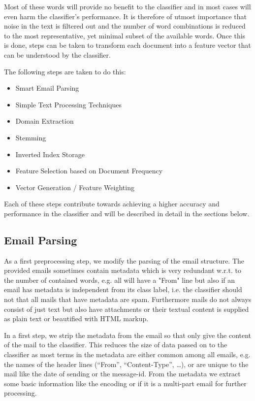 Most of these words will provide no benefit to the classifier and in most cases will even harm the classifier's performance. It is therefore of utmost importance that noise in the text is filtered out and the number of word combinations is reduced to the most representative, yet minimal subset of the available words. Once this is done, steps can be taken to transform each document into a feature vector that can be understood by the classifier. 

The following steps are taken to do this:
\begin{itemize}
	\item Smart Email Parsing
	\item Simple Text Processing Techniques
	\item Domain Extraction
	\item Stemming
	\item Inverted Index Storage
	\item Feature Selection based on Document Frequency
	\item Vector Generation / Feature Weighting
\end{itemize}

Each of these steps contribute towards achieving a higher accuracy and performance in the classifier and will be described in detail in the sections below.

\subsection{Email Parsing}
As a first preprocessing step, we modify the parsing of the email structure.
The provided emails sometimes contain metadata which is very redundant w.r.t. to the number of contained words, e.g. all will have a "From" line but also if an email has metadata is independent from its class label, i.e. the classifier should not that all mails that have metadata are spam.
Furthermore mails do not always consist of just text but also have attachments or their textual content is supplied as plain text or beautified with HTML markup.

In a first step, we strip the metadata from the email so that only give the content of the mail to the classifier.
This reduces the size of data passed on to the classifier as most terms in the metadata are either common among all emails, e.g. the names of the header lines (``From'', ``Content-Type'', \dots), or are unique to the mail like the date of sending or the message-id.
From the metadata we extract some basic information like the encoding or if it is a multi-part email for further processing.

